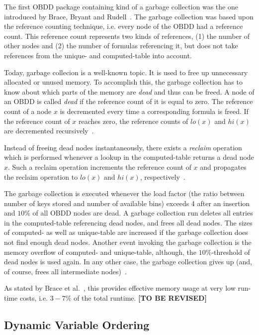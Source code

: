 \documentclass{vldb}
\newcommand{\tbr}{\textbf{[TO BE REVISED]}}
\begin{document}
The first OBDD package containing kind of a garbage collection was the one
introduced by Brace, Bryant and Rudell~\cite{BRACE90}. The garbage collection was
based upon the reference counting technique, i.e. every node of the OBDD had a
reference count. This reference count represents two kinds of references, (1)
the number of other nodes and (2) the number of formulas referencing it, but does
not take references from the unique- and computed-table into account.

Today, garbage collecion is a well-known topic. It is used to free up unnecessary
allocated or unused memory. To accomplish this, the garbage collection has to know
about which parts of the memory are \textit{dead} and thus can be freed. A node
of an OBDD is called \textit{dead} if the reference count of it is equal to zero.
The reference count of a node $x$ is decremented every time a corresponding
formula is freed. If the reference count of $x$ reaches zero, the reference counts
of $lo(x)$ and $hi(x)$ are decremented recursively~\cite{BRACE90}.

Instead of freeing dead nodes instantaneously, there exists a \textit{reclaim}
operation which is performed whenever a lookup in the computed-table returns a
dead node $x$. Such a reclaim operation increments the reference count of $x$ and
propagates the reclaim operation to $lo(x)$ and $hi(x)$,
respectively~\cite{BRACE90}.

The garbage collection is executed whenever the load factor (the ratio between
number of keys stored and number of available bins) exceeds 4 after an insertion
and $10\%$ of all OBDD nodes are dead. A garbage collection run deletes all entries
in the computed-table referencing dead nodes, and frees all dead nodes. The sizes
of computed- as well as unique-table are increased if the garbage collection does
not find enough dead nodes. Another event invoking the garbage collection is the
memory overflow of computed- and unique-table, although, the $10\%$-threshold of
dead nodes is used again. In any other case, the garbage collection gives up (and,
of course, frees all intermediate nodes)~\cite{BRACE90}.

As stated by Brace et al.~\cite{BRACE90}, this provides effective memory usage
at very low run-time costs, i.e. $3-7\%$ of the total runtime. \tbr

\subsection{Dynamic Variable Ordering}
\label{subsec:dynamic-variable-ordering}
\end{document}

